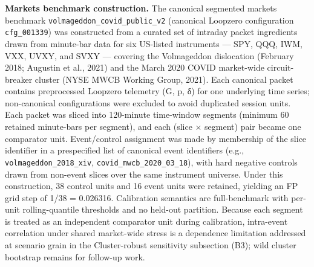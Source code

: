 \documentclass[
  11pt,
]{article}
\begin{document}
\textbf{Markets benchmark construction.} The canonical segmented markets
benchmark \texttt{volmageddon\_covid\_public\_v2} (canonical Loopzero
configuration \texttt{cfg\_001339}) was constructed from a curated set
of intraday packet ingredients drawn from minute-bar data for six
US-listed instruments --- SPY, QQQ, IWM, VXX, UVXY, and SVXY ---
covering the Volmageddon dislocation (February 2018; Augustin et al.,
2021) and the March 2020 COVID market-wide circuit-breaker cluster (NYSE
MWCB Working Group, 2021). Each canonical packet contains preprocessed
Loopzero telemetry (G, p, δ) for one underlying time series;
non-canonical configurations were excluded to avoid duplicated session
units. Each packet was sliced into 120-minute time-window segments
(minimum 60 retained minute-bars per segment), and each (slice ×
segment) pair became one comparator unit. Event/control assignment was
made by membership of the slice identifier in a prespecified list of
canonical event identifiers (e.g., \texttt{volmageddon\_2018\_xiv},
\texttt{covid\_mwcb\_2020\_03\_18}), with hard negative controls drawn
from non-event slices over the same instrument universe. Under this
construction, 38 control units and 16 event units were retained,
yielding an FP grid step of 1/38 = 0.026316. Calibration semantics are
full-benchmark with per-unit rolling-quantile thresholds and no held-out
partition. Because each segment is treated as an independent comparator
unit during calibration, intra-event correlation under shared
market-wide stress is a dependence limitation addressed at scenario
grain in the Cluster-robust sensitivity subsection (B3); wild cluster
bootstrap remains for follow-up work.
\end{document}
